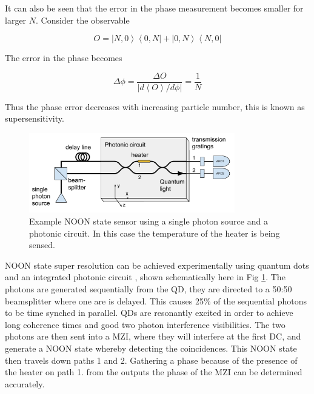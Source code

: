 It can also be seen that the error in the phase measurement becomes smaller for
larger $N$. Consider the observable

\begin{equation} O = \left|N, 0\right\rangle \left\langle 0, N\right| + \left|0,
N\right\rangle \left\langle N, 0\right| \end{equation}

The error in the phase becomes

\begin{equation} \Delta \phi = \frac{\Delta O}{ | d \left\langle O \right\rangle /
d \phi | } = \frac{1}{N} \end{equation}

Thus the phase error decreases with increasing particle number, this is known as
supersensitivity.

\begin{figure}[h!] \begin{center}
\includegraphics[width=0.8\textwidth]{images/noon.pdf} \end{center}
\caption{Example NOON state sensor using a single photon source and a photonic circuit. In this case
the temperature of the heater is being sensed.} \label{fig:noon-chip} \end{figure}

NOON state super resolution can be achieved experimentally using quantum dots
and an integrated photonic circuit \cite{bennett2015cavity}, shown schematically
here in Fig \ref{fig:noon-chip}.
The photons are generated sequentially from the QD, they are directed to a 50:50
beamsplitter where one are is delayed. This causes 25\% of the sequential photons
to be time synched in parallel. QDs are resonantly excited in order to achieve
long coherence times and good two photon interference visibilities. The two photons
are then sent into a MZI, where they will interfere at the first DC, and generate a
NOON state whereby detecting the coincidences. This NOON state then travels down paths
1 and 2. Gathering a phase because of the presence of the heater on path 1.
from the outputs the phase of the MZI can be determined accurately.


